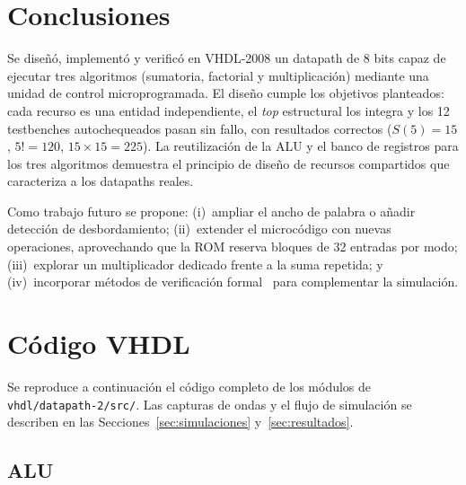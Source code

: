 \documentclass[llncs]{llncs}
\begin{document}
\section{Conclusiones}
\label{sec:conclusiones}

Se diseñó, implementó y verificó en VHDL-2008 un datapath de 8 bits capaz de
ejecutar tres algoritmos (sumatoria, factorial y multiplicación) mediante una
unidad de control microprogramada. El diseño cumple los objetivos planteados:
cada recurso es una entidad independiente, el \emph{top} estructural los
integra y los 12 testbenches autochequeados pasan sin fallo, con resultados
correctos ($S(5)=15$, $5!=120$, $15\times15=225$). La reutilización de la ALU
y el banco de registros para los tres algoritmos demuestra el principio de
diseño de recursos compartidos que caracteriza a los datapaths reales.

Como trabajo futuro se propone: (i)~ampliar el ancho de palabra o añadir
detección de desbordamiento; (ii)~extender el microcódigo con nuevas
operaciones, aprovechando que la ROM reserva bloques de 32 entradas por modo;
(iii)~explorar un multiplicador dedicado frente a la suma repetida; y
(iv)~incorporar métodos de verificación formal~\cite{gupta1992,borrione1992}
para complementar la simulación.




\appendix
\section{Código VHDL}
\label{app:codigo}

Se reproduce a continuación el código completo de los módulos de
\texttt{vhdl/datapath-2/src/}. Las capturas de ondas y el flujo de
simulación se describen en las Secciones~\ref{sec:simulaciones}
y~\ref{sec:resultados}.

\subsection{ALU}

\end{document}
